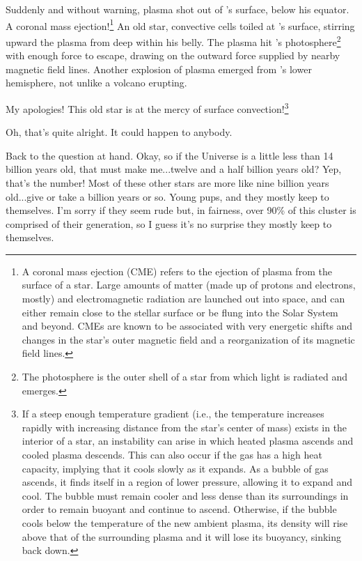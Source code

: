 \documentclass[main.tex]{subfiles}
\begin{document}
\par \nar Suddenly and without warning, plasma shot out of \rmenrico's surface, below his equator.  A coronal mass ejection!\footnote{A coronal mass ejection (CME) refers to the ejection of plasma from the surface of a star.  Large amounts of matter (made up of protons and electrons, mostly) and electromagnetic radiation are launched out into space, and can either remain close to the stellar surface or be flung into the Solar System and beyond.  CMEs are known to be associated with very energetic shifts and changes in the star's outer magnetic field and a reorganization of its magnetic field lines.}  An old star, convective cells toiled at \rmenrico's surface, stirring upward the plasma from deep within his belly.  The plasma hit \rmenrico's photosphere\footnote{The photosphere is the outer shell of a star from which light is radiated and emerges.} with enough force to escape, drawing on the outward force supplied by nearby magnetic field lines.  Another explosion of plasma emerged from \rmenrico's lower hemisphere, not unlike a volcano erupting.

\par \Enrico My apologies!  This old star is at the mercy of surface convection!\footnote{If a steep enough temperature gradient (i.e., the temperature increases rapidly with increasing distance from the star's center of mass) exists in the interior of a star, an instability can arise in which heated plasma ascends and cooled plasma descends. This can also occur if the gas has a high heat capacity, implying that it cools slowly as it expands.  As a bubble of gas ascends, it finds itself in a region of lower pressure, allowing it to expand and cool.  The bubble must remain cooler and less dense than its surroundings in order to remain buoyant and continue to ascend.  Otherwise, if the bubble cools below the temperature of the new ambient plasma, its density will rise above that of the surrounding plasma and it will lose its buoyancy, sinking back down.}

\par \Sterope Oh, that's quite alright.  It could happen to anybody.

\par \Enrico Back to the question at hand.  Okay, so if the Universe is a little less than 14 billion years old, that must make me...twelve and a half billion years old?  Yep, that's the number!  Most of these other stars are more like nine billion years old...give or take a billion years or so.  Young pups, and they mostly keep to themselves.  I'm sorry if they seem rude but, in fairness, over 90\% of this cluster is comprised of their generation, so I guess it's no surprise they mostly keep to themselves.  
\end{document}
